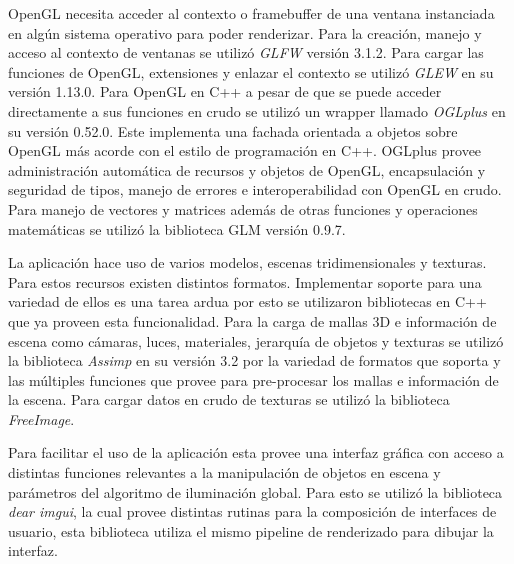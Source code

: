 OpenGL necesita acceder al contexto o framebuffer de una ventana instanciada en algún sistema operativo para poder renderizar. Para la creación, manejo y acceso al contexto de ventanas se utilizó \emph{GLFW} versión 3.1.2. Para cargar las funciones de OpenGL, extensiones y enlazar el contexto se utilizó \emph{GLEW} en su versión 1.13.0. Para OpenGL en C++ a pesar de que se puede acceder directamente a sus funciones en crudo se utilizó un wrapper llamado \emph{OGLplus} en su versión 0.52.0. Este implementa una fachada orientada a objetos sobre OpenGL más acorde con el estilo de programación en C++. OGLplus provee administración automática de recursos y objetos de OpenGL, encapsulación y seguridad de tipos, manejo de errores e interoperabilidad con OpenGL en crudo. Para manejo de vectores y matrices además de otras funciones y operaciones matemáticas se utilizó la biblioteca GLM versión 0.9.7.

La aplicación hace uso de varios modelos, escenas tridimensionales y texturas. Para estos recursos existen distintos formatos. Implementar soporte para una variedad de ellos es una tarea ardua por esto se utilizaron bibliotecas en C++ que ya proveen esta funcionalidad. Para la carga de mallas 3D e información de escena como cámaras, luces, materiales, jerarquía de objetos y texturas se utilizó la biblioteca \emph{Assimp} en su versión 3.2 por la variedad de formatos que soporta y las múltiples funciones que provee para pre-procesar los mallas e información de la escena. Para cargar datos en crudo de texturas se utilizó la biblioteca \emph{FreeImage}.

Para facilitar el uso de la aplicación esta provee una interfaz gráfica con acceso a distintas funciones relevantes a la manipulación de objetos en escena y parámetros del algoritmo de iluminación global. Para esto se utilizó la biblioteca \emph{dear imgui}, la cual provee distintas rutinas para la composición de interfaces de usuario, esta biblioteca utiliza el mismo pipeline de renderizado para dibujar la interfaz.
